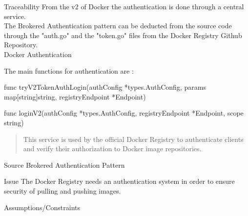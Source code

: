 \begin{patdescription}

\item[Traceability]
From the v2 of Docker the authentication is done through a central service. \\
The Brokered Authentication pattern can be deducted from the source code through the "auth.go" and the "token.go" files from the Docker Registry Github Repository. \\
Docker Authentication \cite{dockauth}

The main functions for authentication are : \\
\begin{mynesteditemlist}
\item func tryV2TokenAuthLogin(authConfig *types.AuthConfig, params map[string]string, registryEndpoint *Endpoint)
\item func loginV2(authConfig *types.AuthConfig, registryEndpoint *Endpoint, scope string) 
\end{mynesteditemlist}

\begin{quote}
This service is used by the official Docker Registry to authenticate clients and verify their authorization to Docker image repositories.
\end{quote}

\item[Source]
Brokered Authentication Pattern\cite{brokeredauth} \\

\item[Issue] The Docker Registry needs an authentication system in order to ensure security of pulling and pushing images.

\item[Assumptions/Constraints] 



\end{patdescription}
